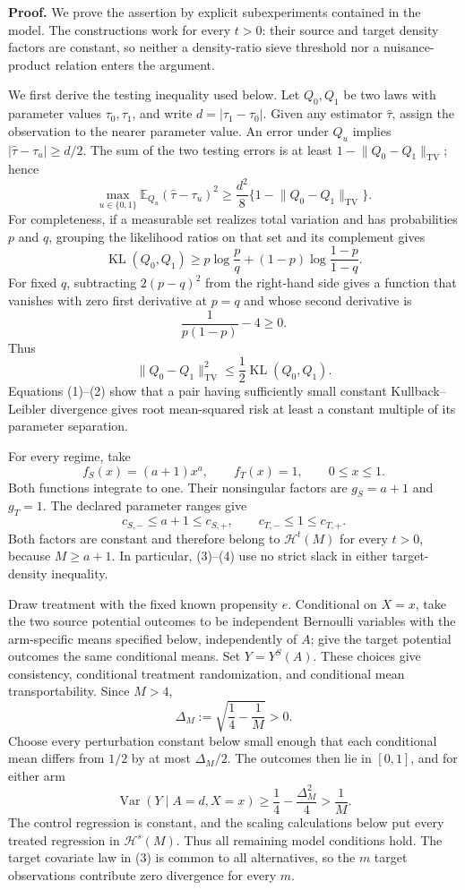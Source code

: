 \textbf{Proof.}
We prove the assertion by explicit subexperiments contained in the model. The constructions work for every \(t>0\): their source and target density factors are constant, so neither a density-ratio sieve threshold nor a nuisance-product relation enters the argument.

We first derive the testing inequality used below. Let \(Q_0,Q_1\) be two laws with parameter values \(\tau_0,\tau_1\), and write \(d=|\tau_1-\tau_0|\). Given any estimator \(\widehat\tau\), assign the observation to the nearer parameter value. An error under \(Q_u\) implies \(|\widehat\tau-\tau_u|\ge d/2\). The sum of the two testing errors is at least \(1-\lVert Q_0-Q_1\rVert_{\mathrm{TV}}\); hence
\[
 \max_{u\in\{0,1\}}\mathbb E_{Q_u}
       (\widehat\tau-\tau_u)^2
 \ge \frac{d^2}{8}
       \{1-\lVert Q_0-Q_1\rVert_{\mathrm{TV}}\}.
\tag{1}
\]
For completeness, if a measurable set realizes total variation and has probabilities \(p\) and \(q\), grouping the likelihood ratios on that set and its complement gives
\[
 \operatorname{KL}(Q_0,Q_1)\ge
 p\log\frac pq+(1-p)\log\frac{1-p}{1-q}.
\]
For fixed \(q\), subtracting \(2(p-q)^2\) from the right-hand side gives a function that vanishes with zero first derivative at \(p=q\) and whose second derivative is
\[
 \frac1{p(1-p)}-4\ge0.
\]
Thus
\[
 \lVert Q_0-Q_1\rVert_{\mathrm{TV}}^2
 \le\frac12\operatorname{KL}(Q_0,Q_1).
\tag{2}
\]
Equations (1)--(2) show that a pair having sufficiently small constant Kullback--Leibler divergence gives root mean-squared risk at least a constant multiple of its parameter separation.

For every regime, take
\[
 f_S(x)=(a+1)x^a,
 \qquad f_T(x)=1,
 \qquad 0\le x\le1.
\tag{3}
\]
Both functions integrate to one. Their nonsingular factors are \(g_S=a+1\) and \(g_T=1\). The declared parameter ranges give
\[
 c_{S,-}\le a+1\le c_{S,+},
 \qquad
 c_{T,-}\le1\le c_{T,+}.
\tag{4}
\]
Both factors are constant and therefore belong to \(\mathcal H^t(M)\) for every \(t>0\), because \(M\ge a+1\). In particular, (3)--(4) use no strict slack in either target-density inequality.

Draw treatment with the fixed known propensity \(e\). Conditional on \(X=x\), take the two source potential outcomes to be independent Bernoulli variables with the arm-specific means specified below, independently of \(A\); give the target potential outcomes the same conditional means. Set \(Y=Y^S(A)\). These choices give consistency, conditional treatment randomization, and conditional mean transportability. Since \(M>4\),
\[
 \Delta_M:=\sqrt{\frac14-\frac1M}>0.
\]
Choose every perturbation constant below small enough that each conditional mean differs from \(1/2\) by at most \(\Delta_M/2\). The outcomes then lie in \([0,1]\), and for either arm
\[
 \operatorname{Var}(Y\mid A=d,X=x)
 \ge \frac14-\frac{\Delta_M^2}{4}
 >\frac1M.
\tag{5}
\]
The control regression is constant, and the scaling calculations below put every treated regression in \(\mathcal H^s(M)\). Thus all remaining model conditions hold. The target covariate law in (3) is common to all alternatives, so the \(m\) target observations contribute zero divergence for every \(m\).

